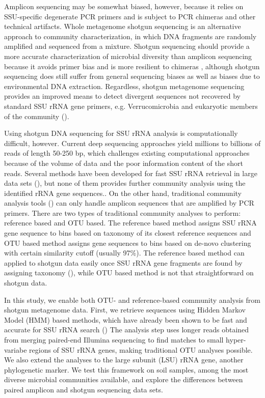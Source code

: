 \documentclass[12pt]{article}
\begin{document}
Amplicon sequencing may be somewhat biased, however, because it
relies on SSU-specific degenerate PCR primers and is subject to
PCR chimeras and other technical artifacts.
Whole metagenome shotgun sequencing is an alternative approach to
community characterization, in which DNA fragments are randomly
amplified and sequenced from a mixture.  Shotgun sequencing should
provide a more accurate characterization of microbial diversity
than amplicon sequencing
because it avoids primer bias and is more resilient to chimeras
\cite{chimeraslayer}, although shotgun sequencing does still
suffer from general sequencing biases as well as biases due to
environmental DNA extraction.
Regardless, shotgun metagenome sequencing provides an improved means
to detect divergent sequences not recovered by standard SSU rRNA gene
primers, e.g. Verrucomicrobia and eukaryotic members of the community
(\cite{baker2003,primereva2008,verruco2011}).

Using shotgun DNA sequencing for SSU rRNA analysis is computationally
difficult, however.  Current deep sequencing approaches yield millions
to billions of reads of length 50-250 bp, which challenges existing
computational approaches because of the volume of data and the poor
information content of the short reads.
Several methods have been
developed for fast SSU rRNA retrieval in large data sets
(\cite{ribopicker,metarna,rrnaselector,metaxa}), but none of them
provides further community analysis using the identified rRNA gene
sequences.. On the other hand,
traditional community analysis tools (\cite{rdp2009,mothur,qiime}) can
only handle amplicon sequences that are amplified by PCR primers.
There are two types of traditional community analyses to perform:
reference based and OTU based. The reference based method assigns SSU
rRNA gene sequence to bins based on taxonomy of its closest reference
sequences and OTU based method assigns gene sequences to bins based on
de-novo clustering with certain similarity cutoff (usually 97\%). The
reference based method can applied to shotgun data easily once SSU
rRNA gene fragments are found by assigning taxonomy
(\cite{rdpclassifier}), while OTU based method is not that
straightforward on shotgun data.

In this study, we enable both OTU- and reference-based community
analysis from shotgun metagenome data.  First, we retrieve sequences
using Hidden Markov Model (HMM) based methods, which have already been
shown to be fast and accurate for SSU rRNA search
(\cite{metarna,rrnaselector,metaxa}) The analysis step uses longer
reads obtained from merging paired-end Illumina sequencing to find
matches to small hyper-variabe regions of SSU rRNA genes, making
traditional OTU analyses possible.  We also extend the analyses to
the large subunit (LSU) rRNA gene, another phylogenetic marker.
We test this framework on soil samples, among the most diverse
microbial communities available, and explore the differences between
paired amplicon and shotgun sequencing data sets.
\end{document}

